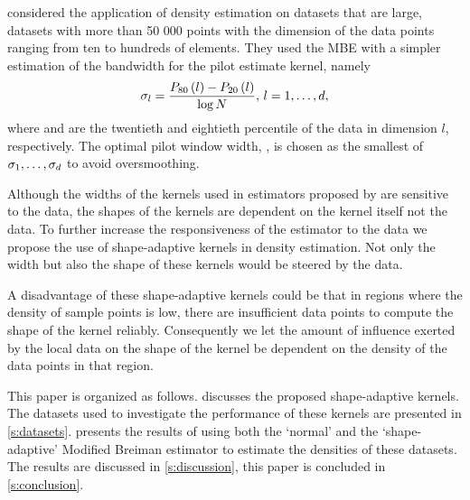 	\textcite{ferdosi2011comparison} considered the application of density estimation on datasets that are large, \ie datasets with more than 50 000 points with the dimension of the data points ranging from ten to hundreds of elements. They used the MBE with a simpler estimation of the bandwidth for the pilot estimate kernel, namely 
		\begin{equation}\label{eq:1:ferdosiGeneralBandwidth}
			\sigma_l = \frac{P_{80}\left( l \right) - P_{20}\left( l \right)}{\log N}, \, l = 1, \dotsc, d,
		\end{equation}
	where  and  are the twentieth and eightieth percentile of the data in dimension $l$, respectively. 
	The optimal pilot window width, \varBandwidth, is chosen as the smallest of $\sigma_1, \dotsc, \sigma_d$ to avoid oversmoothing.

	Although the widths of the kernels used in estimators proposed by \citeauthor{breiman1977variable,wilkinson1995dataplot} are sensitive to the data, the shapes of the kernels are dependent on the kernel itself not the data. To further increase the responsiveness of the estimator to the data we propose the use of shape-adaptive kernels in density estimation. Not only the width but also the shape of these kernels would be steered by the data. 

	A disadvantage of these shape-adaptive kernels could be that in regions where the density of sample points is low, there are insufficient data points to compute the shape of the kernel reliably. Consequently we let the amount of influence exerted by the local data on the shape of the kernel be dependent on the density of the data points in that region.

	This paper is organized as follows.  discusses the proposed shape-adaptive kernels. The datasets used to investigate the performance of these kernels are presented in \cref{s:datasets}.  presents the results of using both the `normal' and the `shape-adaptive' Modified Breiman estimator to estimate the densities of these datasets. The results are discussed in \cref{s:discussion}, this paper is concluded in \cref{s:conclusion}.